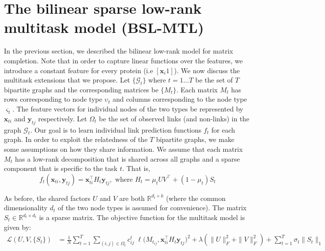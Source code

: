 \documentclass[runningheads,a4paper]{llncs}
\begin{document}

\section{The bilinear sparse low-rank multitask model (BSL-MTL)} 
\label{ourmodel}
In the previous section, we described the bilinear low-rank model for matrix completion. 
Note that in order to capture linear functions over the features, we introduce a constant feature for every protein 
(i.e $[\mathbf{x}_i 1]$). We now discuss the multitask extensions that we propose. Let $\{\mathcal{G}_t\}$ where $t=1 \ldots T$ be the set of $T$ bipartite graphs and the corresponding matrices be $\{M_t\}$. Each matrix $M_t$ has rows corresponding to node type $\upsilon_t$ and columns corresponding to the node type $\varsigma_t$. The feature vectors for individual nodes of the two types be represented by $\mathbf{x}_{ti}$ and $\mathbf{y}_{tj}$ respectively. Let $\Omega_t$ be the set of observed links (and non-links) in the graph $\mathcal{G}_t$. Our goal is to learn individual link prediction functions $f_t$ for each graph. In order to exploit the relatedness of the $T$ bipartite graphs, we make some assumptions on how they share information. We assume that each matrix $M_t$ has a low-rank decomposition that is shared across all graphs and a sparse component that is specific to the task $t$. That is,
\begin{equation}
f_t(\mathbf{x}_{ti}, \mathbf{y}_{tj}) = \mathbf{x}_{ti}^\intercal H_t \mathbf{y}_{tj}, \textrm{ where } H_t = \mu_t U V^\intercal + (1-\mu_t)  S_t
\end{equation}

As before, the shared factors $U$ and $V$ are both $\mathbb{R}^{d_t \times k}$ (where the common dimensionality $d_t$ of the two node types is assumed for convenience). The matrix $S_t \in \mathbb{R}^{d_t \times d_t}$ is a sparse matrix. The objective function for the multitask model is given by:
\begin{equation}
\label{mtl_objective}
\begin{array}{ll}
\mathcal{L}(U,V,\{S_t\}) & = \displaystyle{ \frac{1}{N} \sum_{t=1}^T \sum_{(i,j) \in \Omega_t}} c^t_{ij} \; \ell \big( M_{t_{ij}}, \mathbf{x}_{ti}^\intercal H_t \mathbf{y}_{tj} \big)^2 + \lambda ( \|U\|^2_F + \|V\|^2_F ) + \displaystyle{\sum_{t=1}^T \sigma_t \|S_t\|_1} 
\end{array}
\end{equation}
\end{document}
